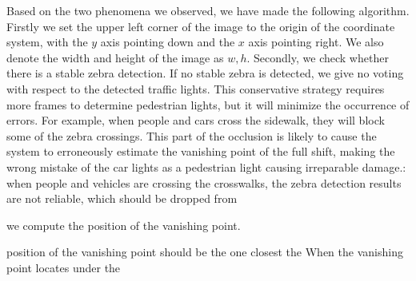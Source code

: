 Based on the two phenomena we observed, we have made the following algorithm. Firstly we set the upper left corner of the image to the origin of the coordinate system, with the $y$ axis pointing down and the $x$ axis pointing right. We also denote the width and height of the image as $w, h$. Secondly, we check whether there is a stable zebra detection. If no stable zebra is detected, we give no voting with respect to the detected traffic lights. This conservative strategy requires more frames to determine pedestrian lights, but it will minimize the occurrence of errors. For example, when people and cars cross the sidewalk, they will block some of the zebra crossings. This part of the occlusion is likely to cause the system to erroneously estimate the vanishing point of the full shift, making the wrong mistake of the car lights as a pedestrian light causing irreparable damage.: when people and vehicles are crossing the crosswalks, the zebra detection results are not reliable, which should be dropped from 

we compute the position of the vanishing point.



   position of the vanishing point should be the one closest the  When the vanishing point locates under the 

